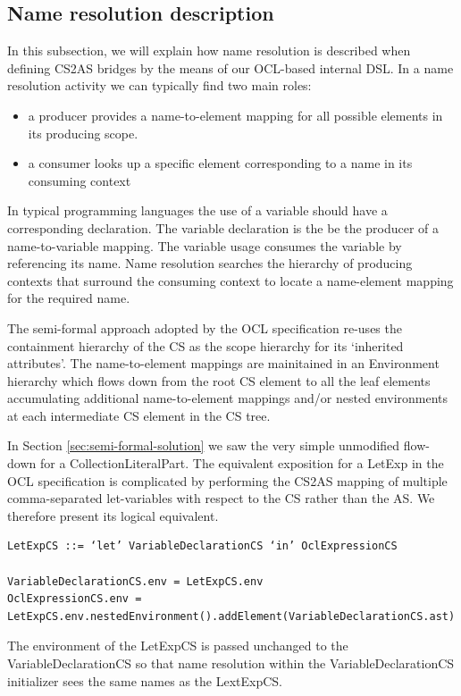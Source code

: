 \documentclass{llncs}
\begin{document}
\subsection{Name resolution description}
\label{subsec:nameReso}
In this subsection, we will explain how name resolution is described when defining CS2AS bridges by the means of our OCL-based internal DSL. In a name resolution activity we can typically find two main roles:
\begin{itemize}
\item a producer provides a name-to-element mapping for all possible elements in its producing scope. 
\item a consumer looks up a specific element corresponding to a name in its consuming context
\end{itemize}
In typical programming languages the use of a variable should have a corresponding declaration. The variable declaration is the be the producer of a name-to-variable mapping. The variable usage consumes the variable by referencing its name. Name resolution searches the hierarchy of producing contexts that surround the consuming context to locate a name-element mapping for the required name.

The semi-formal approach adopted by the OCL specification re-uses the containment hierarchy of the CS as the scope hierarchy for its `inherited attributes'. The name-to-element mappings are mainitained in an Environment hierarchy which flows down from the root CS element to all the leaf elements accumulating additional name-to-element mappings and/or nested environments at each intermediate CS element in the CS tree.

In Section \ref{sec:semi-formal-solution} we saw the very simple unmodified flow-down for a CollectionLiteralPart. The equivalent exposition for a LetExp in the OCL specification is complicated by performing the CS2AS mapping of multiple comma-separated let-variables with respect to the CS rather than the AS. We therefore present its logical equivalent.

\begin{lstlisting}[caption=Semi-formal LetExpCS equivalent, label=lst:semi-formal-letexpcs, language=OCL]
LetExpCS ::= ‘let’ VariableDeclarationCS ‘in’ OclExpressionCS

VariableDeclarationCS.env = LetExpCS.env
OclExpressionCS.env = LetExpCS.env.nestedEnvironment().addElement(VariableDeclarationCS.ast)
\end{lstlisting}

The environment of the LetExpCS is passed unchanged to the VariableDeclarationCS so that name resolution within the VariableDeclarationCS initializer sees the same names as the LextExpCS.
\end{document}
